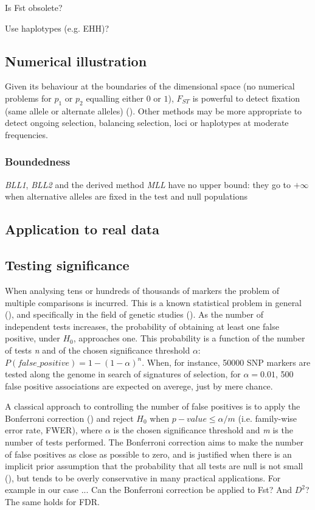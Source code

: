 \documentclass{bmcart}
\begin{document}
Is Fst obsolete?

Use haplotypes (e.g. EHH)?

\subsection*{Numerical illustration}

Given its behaviour at the boundaries of the dimensional space (no
numerical problems for $p_1$ or $p_2$ equalling either $0$ or $1$), $F_{ST}$
is powerful to detect fixation (same allele or alternate alleles)
(\cite{biswas2006genomic}). Other methods may be more appropriate to
detect ongoing selection, balancing selection, loci or haplotypes at
moderate frequencies.

\subsubsection*{Boundedness}
\emph{BLL1}, \emph{BLL2} and the derived method \emph{MLL} have no upper
bound: they go to $+\infty$ when alternative alleles are fixed in the
test and null populations
\subsection*{Application to real data}

\subsection*{Testing significance}

When analysing tens or hundreds of thousands of markers the problem of
multiple comparisons is incurred. This is a known statistical problem in general
(\cite{berry2007difficult}), and specifically in the field of genetic
studies (\cite{lander1994genetic,risch1996future}). As the number of
independent tests increases, the probability of obtaining at least one
false positive, under $H_0$, approaches one. This probability is a
function of the number of tests \emph{n} and of the chosen significance
threshold \emph{\(\alpha\)}: \(P(false\_positive)=1-(1-\alpha)^n\). When, for instance,
50000 SNP markers are tested along the genome in search of signatures of
selection, for $\alpha=0.01$, 500 false positive associations are expected on averege, just
by mere chance. 

A classical approach to controlling the number of false positives is to
apply the Bonferroni correction (\cite{hochberg1988sharper}) and
reject $H_0$ when $p-value \leq  \alpha/m$ (i.e. family-wise error rate,
FWER), where $\alpha$ is the chosen
significance threshold and \emph{m} is the number of tests performed. 
The Bonferroni correction aims to make the number of false positives as
close as possible to zero, and is justified when there is an implicit prior
assumption that the probability that all tests are null is not small
(\cite{westfall1997bayesian,wakefield2008reporting}), but tends to be overly conservative in
many practical applications. For example in our case ...
Can the Bonferroni correction be applied to Fst? And $D^2$? The same holds
for FDR.
\end{document}
